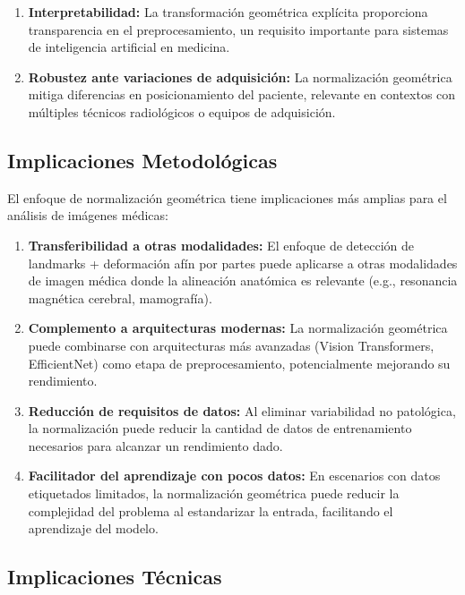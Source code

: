 \begin{enumerate}

    \item \textbf{Interpretabilidad:} La transformación geométrica explícita proporciona transparencia en el preprocesamiento, un requisito importante para sistemas de inteligencia artificial en medicina.

    \item \textbf{Robustez ante variaciones de adquisición:} La normalización geométrica mitiga diferencias en posicionamiento del paciente, relevante en contextos con múltiples técnicos radiológicos o equipos de adquisición.
\end{enumerate}

\subsection{Implicaciones Metodológicas}
\label{subsec:implicaciones_metodologicas}

El enfoque de normalización geométrica tiene implicaciones más amplias para el análisis de imágenes médicas:

\begin{enumerate}
    \item \textbf{Transferibilidad a otras modalidades:} El enfoque de detección de landmarks + deformación afín por partes puede aplicarse a otras modalidades de imagen médica donde la alineación anatómica es relevante (e.g., resonancia magnética cerebral, mamografía).

    \item \textbf{Complemento a arquitecturas modernas:} La normalización geométrica puede combinarse con arquitecturas más avanzadas (Vision Transformers, EfficientNet) como etapa de preprocesamiento, potencialmente mejorando su rendimiento.

    \item \textbf{Reducción de requisitos de datos:} Al eliminar variabilidad no patológica, la normalización puede reducir la cantidad de datos de entrenamiento necesarios para alcanzar un rendimiento dado.

    \item \textbf{Facilitador del aprendizaje con pocos datos:} En escenarios con datos etiquetados limitados, la normalización geométrica puede reducir la complejidad del problema al estandarizar la entrada, facilitando el aprendizaje del modelo.
\end{enumerate}

\subsection{Implicaciones Técnicas}
\label{subsec:implicaciones_tecnicas}

